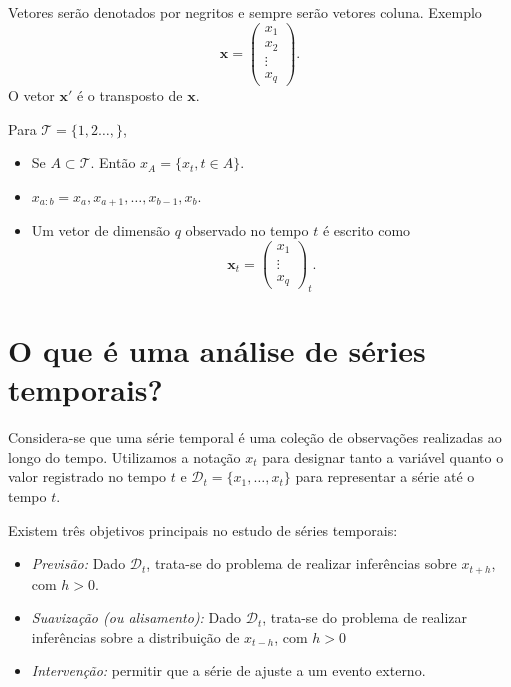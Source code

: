 \documentclass[
  letterpaper,
  DIV=11,
  numbers=noendperiod]{scrartcl}
\providecommand{\tightlist}{%
  \setlength{\itemsep}{0pt}\setlength{\parskip}{0pt}}
\theoremstyle{definition}
\theoremstyle{definition}
\theoremstyle{plain}
\theoremstyle{plain}
\theoremstyle{remark}
\begin{document}
Vetores serão denotados por negritos e sempre serão vetores coluna.
Exemplo
\[\boldsymbol{x}=\left(\begin{array}{c}x_1 \\ x_2 \\ \vdots \\ x_q\end{array}\right).\]
O vetor \(\boldsymbol{x}'\) é o transposto de \(\boldsymbol{x}\).

Para \(\mathcal{T}=\{1,2\ldots,\}\),

\begin{itemize}
\tightlist
\item
  Se \(A\subset\mathcal{T}\). Então \(x_A=\{x_{t},t\in A\}\).
\item
  \(x_{a:b}=x_a,x_{a+1},\ldots,x_{b-1},x_{b}.\)
\item
  Um vetor de dimensão \(q\) observado no tempo \(t\) é escrito como
  \[\boldsymbol{x}_t =\left(\begin{array}{c}x_{1} \\ \vdots \\ x_{q}\end{array}\right)_{t}.\]
\end{itemize}

\section{O que é uma análise de séries
temporais?}\label{o-que-uxe9-uma-anuxe1lise-de-suxe9ries-temporais}

Considera-se que uma série temporal é uma coleção de observações
realizadas ao longo do tempo. Utilizamos a notação \(x_t\) para designar
tanto a variável quanto o valor registrado no tempo \(t\) e
\(\mathcal{D}_t=\{x_1,\ldots,x_t\}\) para representar a série até o
tempo \(t\).

Existem três objetivos principais no estudo de séries temporais:

\begin{itemize}
\item
  \emph{Previsão:} Dado \(\mathcal{D}_t\), trata-se do problema de
  realizar inferências sobre \(x_{t+h}\), com \(h>0\).
\item
  \emph{Suavização (ou alisamento):} Dado \(\mathcal{D}_t\), trata-se do
  problema de realizar inferências sobre a distribuição de \(x_{t-h}\),
  com \(h>0\)
\item
  \emph{Intervenção:} permitir que a série de ajuste a um evento
  externo.
\end{itemize}
\end{document}
